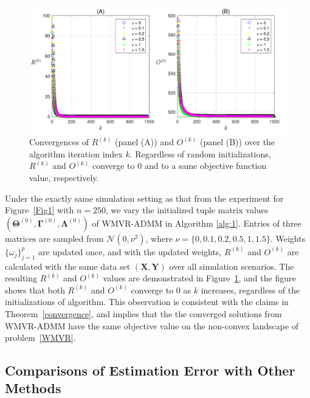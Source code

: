\documentclass[alpha-refs]{wiley-article}
\begin{document}
\begin{figure} [t!]
  \includegraphics[width=120mm]{Figure/Fig4.pdf}
  \centering
  \caption{Convergences of $R^{(k)}$ (panel (A)) and $O^{(k)}$ (panel (B)) over the algorithm iteration index $k$.
  Regardless of random initializations, $R^{(k)}$ and $O^{(k)}$ converge to $0$ and to a same objective function value, respectively.}
  \label{Fig4}
\end{figure}

Under the exactly same simulation setting as that from the experiment for Figure~\ref{Fig1} with $n=250$, we vary the initialized tuple matrix values $(\boldsymbol{\Theta}^{(0)},\boldsymbol{\Gamma}^{(0)},\boldsymbol{\Lambda}^{(0)})$ of WMVR-ADMM in Algorithm \ref{alg:1}. 
Entries of three matrices are sampled from $\mathcal{N}(0,\nu^{2})$, where $\nu=\{0,0.1,0.2,0.5,1,1.5\}$. 
Weights $\{\omega_j\}_{j=1}^{p}$ are updated once, and with the updated weights, $R^{(k)}$ and $O^{(k)}$ are calculated with the same data set $(\boldsymbol{X},\boldsymbol{Y})$ over all simulation scenarios. 
The resulting  $R^{(k)}$ and $O^{(k)}$ values are demonstrated in Figure~\ref{Fig4}, and the figure shows that both $R^{(k)}$ and $O^{(k)}$ converge to 0 as $k$ increases, regardless of the initializations of algorithm.  
This observation is consistent with the claims in Theorem~\ref{convergence}, and implies that the the converged solutions from WMVR-ADMM have the same objective value on the non-convex landscape of problem~\eqref{WMVR}.

\subsection{Comparisons of Estimation Error with Other Methods}
\end{document}

